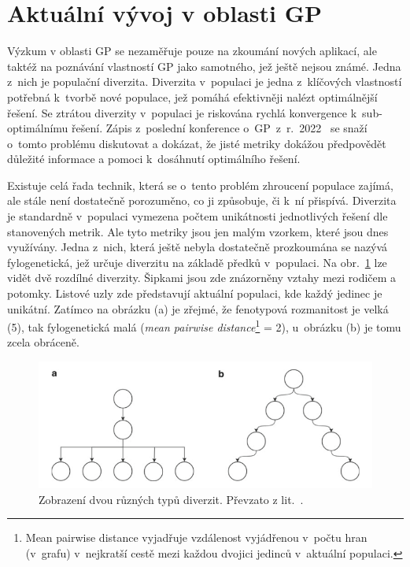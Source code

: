 \section{Aktuální vývoj v oblasti GP}
Výzkum v oblasti GP se nezaměřuje pouze na zkoumání nových aplikací, ale taktéž na poznávání vlastností GP jako samotného, jež ještě nejsou známé. Jedna z~nich je populační diverzita. Diverzita v~populaci je jedna z~klíčových vlastností potřebná k~tvorbě nové populace, jež pomáhá efektivněji nalézt optimálnější řešení. Se ztrátou diverzity v~populaci je riskována rychlá konvergence k~sub-optimálnímu řešení. Zápis z~poslední konference o~GP~z~r.~2022~\cite{GPTPXVIII} se snaží o~tomto problému diskutovat a dokázat, že jisté metriky  dokážou předpovědět důležité informace a pomoci k~dosáhnutí optimálního řešení. 

Existuje celá řada technik, která se o~tento problém zhroucení populace zajímá, ale stále není dostatečně porozuměno, co ji způsobuje, či k~ní přispívá. Diverzita je standardně v~populaci vymezena počtem unikátnosti jednotlivých řešení dle stanovených metrik. Ale tyto metriky jsou jen malým vzorkem, které jsou dnes využívány. Jedna z~nich, která ještě nebyla dostatečně prozkoumána se nazývá fylogenetická, jež určuje diverzitu na základě předků v~populaci. Na obr.~\ref{fig:pop_diverisities} lze vidět dvě rozdílné diverzity. Šipkami jsou zde znázorněny vztahy mezi rodičem a potomky. Listové uzly zde představují aktuální populaci, kde každý jedinec je unikátní. Zatímco na obrázku (a) je zřejmé, že fenotypová rozmanitost je velká (5), tak fylogenetická malá (\emph{mean pairwise distance}\footnote{Mean pairwise distance vyjadřuje vzdálenost vyjádřenou v~počtu hran (v~grafu) v~nejkratší cestě mezi každou dvojici jedinců v~aktuální populaci.} = 2), u~obrázku (b) je tomu zcela obráceně.

\begin{figure}[!h]
    \centering
    \includegraphics[scale=0.4]{obrazky-figures/diversities.png}
    \caption{Zobrazení dvou různých typů diverzit. Převzato z lit.~\cite[str. 65]{GPTPXVIII}.}
    \label{fig:pop_diverisities}
\end{figure}


